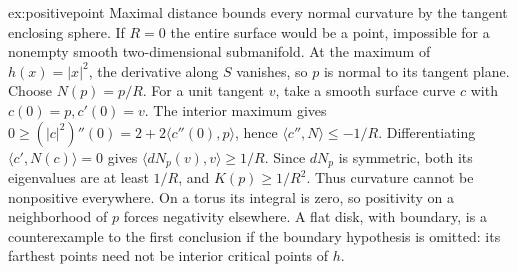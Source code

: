 \begin{solution}{ex:positivepoint}
\idea Maximal distance bounds every normal curvature by the tangent enclosing sphere.
\writeup If $R=0$ the entire surface would be a point, impossible for a nonempty smooth two-dimensional submanifold. At the maximum of $h(x)=|x|^2$, the derivative along $S$ vanishes, so $p$ is normal to its tangent plane. Choose $N(p)=p/R$. For a unit tangent $v$, take a smooth surface curve $c$ with $c(0)=p,c'(0)=v$. The interior maximum gives
$0\ge(|c|^2)''(0)=2+2\langle c''(0),p\rangle$, hence $\langle c'',N\rangle\le-1/R$.
Differentiating $\langle c',N(c)\rangle=0$ gives $\langle dN_p(v),v\rangle\ge1/R$. Since $dN_p$ is symmetric, both its eigenvalues are at least $1/R$, and $K(p)\ge1/R^2$.
Thus curvature cannot be nonpositive everywhere. On a torus its integral is zero, so positivity on a neighborhood of $p$ forces negativity elsewhere. A flat disk, with boundary, is a counterexample to the first conclusion if the boundary hypothesis is omitted: its farthest points need not be interior critical points of $h$.
\end{solution}

